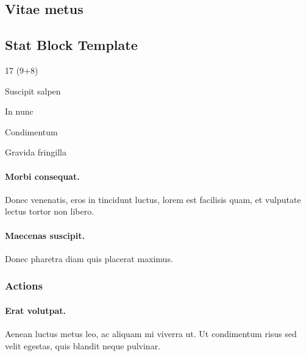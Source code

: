   \subsection*{Vitae metus} \lipsum[124-125]

  \begin{hbStatBlock}
    \subsection*{Stat Block Template}
    \hbSBSep
    \begin{hbStatBlockDescription}
      \item[Scelerisque] 17 (9+8)
      \item[Accumsan] Suscipit salpen
      \item[Dictum] In nunc
    \end{hbStatBlockDescription}
    \hbSBSep
    \hbSBSep
    \begin{hbStatBlockDescription}
      \item[Odio molestie] Condimentum
      \item[Egestas] \hbNone
      \item[Vitae] Gravida fringilla
    \end{hbStatBlockDescription}
    \hbSBSep

    \paragraph*{Morbi consequat.} Donec venenatis, eros in tincidunt luctus, lorem est facilisis quam, et vulputate lectus tortor non libero.

    \paragraph*{Maecenas suscipit.} Donec pharetra diam quis placerat maximus.

    \subsubsection*{Actions}

    \paragraph*{Erat volutpat.} Aenean luctus metus leo, ac aliquam mi viverra ut. Ut condimentum risus sed velit egestas, quis blandit neque pulvinar.

  \end{hbStatBlock}

